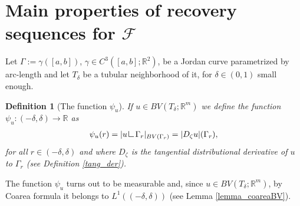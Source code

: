 \documentclass[a4paper,11pt]{article}
\numberwithin{equation}{section}
\newtheorem{definition}[theorem]{Definition}
\def\det{\,{\rm det\ }}
\newcommand{\R}{\mathbb{R}}
\newcommand{\res}      {\mathop{\hbox{\vrule height 7pt width .5pt depth
                        0pt\vrule height .5pt width 6pt depth 0pt}}\nolimits}
\begin{document}
%
%
%

%
%


%
%
%
\section{Main properties of recovery sequences for $\mathcal F$}\label{subsec_properties}
Let $\Gamma:=\gamma([a,b])$, $\gamma\in C^3([a,b];\R^2)$, be a Jordan curve parametrized by arc-length and let $T_\delta$ be a tubular neighborhood of it, for $\delta\in (0,1)$ small enough. 

\begin{definition}[The function $\psi_u$]
If $u\in BV(T_\delta;\R^m)$ we
define the function $\psi_u:(-\delta,\delta)\rightarrow \mathbb R$ as
\begin{align}\label{psi}
	\psi_u(r)=|u\res \Gamma_r|_{BV(\Gamma_r)}=|D_\zeta u|(\Gamma_r),
\end{align}
for all $r\in (-\delta,\delta)$ and where $D_\zeta$ is the tangential distributional derivative of $u$ to $\Gamma_r$ (see Definition \eqref{tang_der}).
\end{definition} 
The function $\psi_u$ turns out to be measurable and, since $u\in BV(T_\delta;\R^m)$, by Coarea formula it belongs to  $L^1((-\delta,\delta))$ (see Lemma \ref{lemma_coareaBV}).
\end{document}
